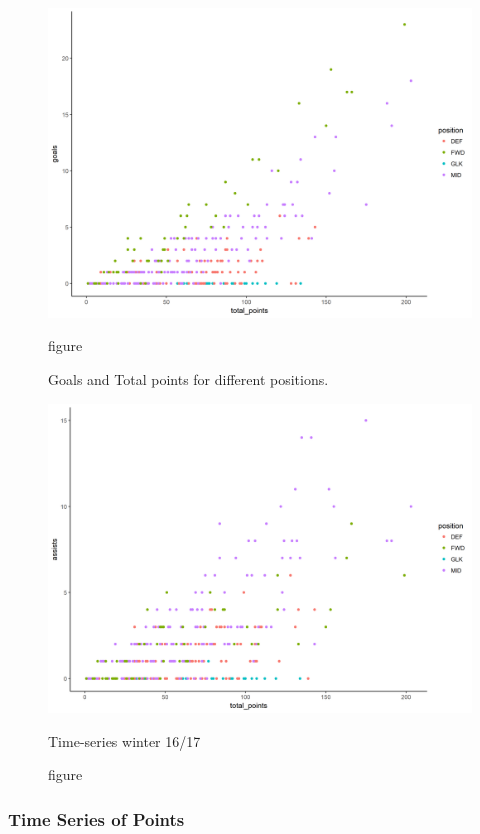 \begin{figure}[h!]
\centering
\begin{minipage}{.5\textwidth}
  \centering
  \captionsetup{justification=centering}
  \includegraphics[width=.9\linewidth]{fig/chapter_6/goals_tot_poins.png}
  \caption{figure}{Goals and Total points for different positions.}
  \label{fig:goal_tot_p}
\end{minipage}
\hfill
\begin{minipage}{.5\textwidth}
  \centering
  \captionsetup{justification=centering}
  \includegraphics[width=.9\linewidth]{fig/chapter_6/assists_tot_poins.png}
  \caption{figure}{Time-series winter 16/17}
  \label{fig:assist_tot_p}
\end{minipage}
\end{figure}



\subsubsection{Time Series of Points}


